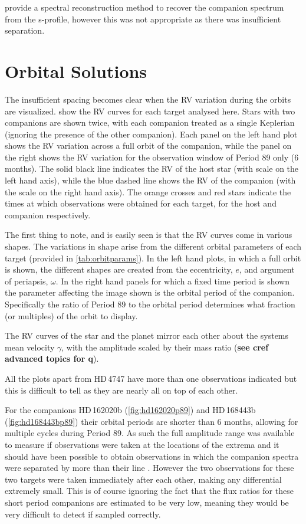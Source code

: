 \citet{ferluga_separating_1997} provide a spectral reconstruction method to recover the companion spectrum from the s-profile, however this was not appropriate as there was insufficient separation.


\section{Orbital Solutions}
\label{sec:orbtial_diagrams}
The insufficient spacing becomes clear when the RV variation during the orbits are visualized.
 show the RV curves for each target analysed here.
Stars with two companions are shown twice, with each companion treated as a single Keplerian (ignoring the presence of the other companion).
Each panel on the left hand plot shows the RV variation across a full orbit of the companion, while the panel on the right shows the RV variation for the observation window of Period 89 only (6 months).
The solid black line indicates the RV of the host star (with scale on the left hand axis), while the blue dashed line shows the RV of the companion (with the scale on the right hand axis).
The orange crosses and red stars indicate the times at which observations were obtained for each target, for the host and companion respectively.

The first thing to note, and is easily seen is that the RV curves come in various shapes.
The variations in shape arise from the different orbital parameters of each target (provided in \cref{tab:orbitparams}).
In the left hand plots, in which a full orbit is shown, the different shapes are created from the eccentricity, $e$, and argument of periapsis, $\omega$.
In the right hand panels for which a fixed time period is shown the parameter affecting the image shown is the orbital period of the companion.
Specifically the ratio of Period 89 to the orbital period determines what fraction (or multiples) of the orbit to display.

The RV curves of the star and the planet mirror each other about the systems mean velocity $\gamma$, with the amplitude scaled by their mass ratio (\textbf{see cref{} advanced topics for q}).

All the plots apart from {HD\,4747} have more than one observations indicated but this is difficult to tell as they are nearly all on top of each other.

For the companions {HD\,162020}b (\cref{fig:hd162020p89}) and {HD\,168443}b (\cref{fig:hd168443bp89}) their orbital periods are shorter than 6 months, allowing for multiple cycles during Period 89.
As such the full amplitude range was available to measure if observations were taken at the locations of the extrema and it should have been possible to obtain observations in which the companion spectra were separated by more than their line \fwhm.
However the two observations for these two targets were taken immediately after each other, making any differential extremely small.
This is of course ignoring the fact that the flux ratios for these short period companions are estimated to be very low, meaning they would be very difficult to detect if sampled correctly.

